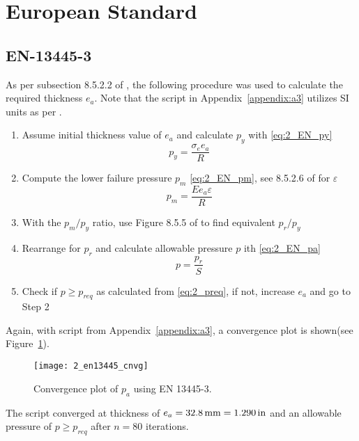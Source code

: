 \section{European Standard}
\subsection{EN-13445-3}
\label{section:2_EN}
As per subsection 8.5.2.2 of \cite{EN134453}, the following procedure was used to calculate the required thickness $e_a$. Note that the script in Appendix~\ref{appendix:a3} utilizes SI units as per \cite{EN134453}.

\begin{enumerate}
	\item Assume initial thickness value of $e_a$ and calculate $p_y$ with \ref{eq:2_EN_py}
	      \begin{equation}
	      	\label{eq:2_EN_py}
	      	p_y = \frac{\sigma_e e_a}{R}
	      \end{equation}
	\item Compute the lower failure pressure $p_m$ \ref{eq:2_EN_pm}, see 8.5.2.6 of \cite{EN134453} for $\varepsilon$
	      \begin{equation}
	      	\label{eq:2_EN_pm}
	      	p_m = \frac{E e_a  \varepsilon}{R}
	      \end{equation}
	\item With the $p_m/p_y$ ratio, use Figure 8.5.5 of \cite{EN134453} to find equivalent $p_r/p_y$
	\item Rearrange for $p_r$ and calculate allowable pressure $p$ ith \ref{eq:2_EN_pa}
	      \begin{equation}
	      	\label{eq:2_EN_pa}
	      	p = \frac{p_r}{S}
	      \end{equation}
	\item Check if $p \geq p_{req}$ as calculated from \ref{eq:2_preq}, if not, increase $e_a$ and go to Step 2\\
\end{enumerate}

Again, with script from Appendix~\ref{appendix:a3}, a convergence plot is shown(see Figure~\ref{fig:2_en13445_cnvg}).
\begin{figure}[H]
	\centering
	\texttt{[image: 2\_en13445\_cnvg]}
	\caption{Convergence plot of $p_a$ using EN 13445-3.}
	\label{fig:2_en13445_cnvg}
\end{figure}

The script converged at thickness of $e_a = 32.8\,\mathrm{mm} = 1.290\,\mathrm{in}$ and an allowable pressure of $p\geq p_{req}$ after $n=80$ iterations. 

